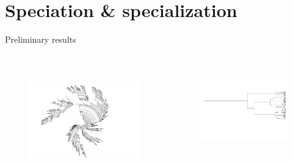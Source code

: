 \documentclass[8pt,handout,notes=show]{beamer}
\begin{document}
%
\section{Speciation & specialization}
\begin{frame}{Preliminary results} %


\begin{columns}


	\begin{figure}
		\includegraphics[height=5cm]{images/aRadialTree}
	\end{figure}
	

	\begin{figure}
	\includegraphics[height=4cm,angle=90]{images/aLinearTree}
	\end{figure}
	
\end{columns}
\begin{columns}
 

		
% 
\end{columns}
\begin{columns}



\end{columns}
\end{frame}
\end{document}
